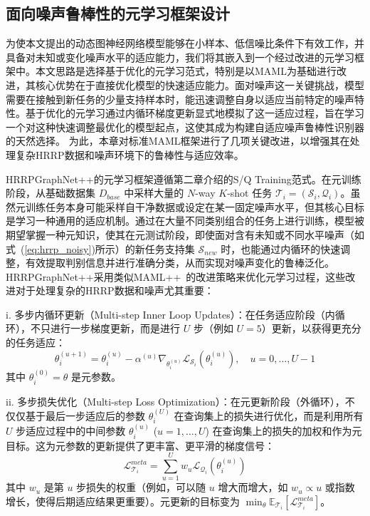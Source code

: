 \subsection{面向噪声鲁棒性的元学习框架设计}
\label{subsec:meta_learning_noise_robust}

为使本文提出的动态图神经网络模型能够在小样本、低信噪比条件下有效工作，并具备对未知或变化噪声水平的适应能力，我们将其嵌入到一个经过改进的元学习框架中。本文思路是选择基于优化的元学习范式，特别是以MAML为基础进行改进，其核心优势在于直接优化模型的快速适应能力。面对噪声这一关键挑战，模型需要在接触到新任务的少量支持样本时，能迅速调整自身以适应当前特定的噪声特性。基于优化的元学习通过内循环梯度更新显式地模拟了这一适应过程，旨在学习一个对这种快速调整最优化的模型起点，这使其成为构建自适应噪声鲁棒性识别器的天然选择。 为此，本章对标准MAML框架进行了几项关键改进，以增强其在处理复杂HRRP数据和噪声环境下的鲁棒性与适应效率。

HRRPGraphNet++的元学习框架遵循第二章介绍的S/Q Training范式。在元训练阶段，从基础数据集 $D_{base}$ 中采样大量的 $N$-way $K$-shot 任务 $\mathcal{T}_i = (\mathcal{S}_i, \mathcal{Q}_i)$。虽然元训练任务本身可能采样自干净数据或设定在某一固定噪声水平，但其核心目标是学习一种通用的适应机制。通过在大量不同类别组合的任务上进行训练，模型被期望掌握一种元知识，使其在元测试阶段，即使面对含有未知或不同水平噪声（如式~(\ref{eq:hrrp_noisy})所示）的新任务支持集 $\mathcal{S}_{new}$ 时，也能通过内循环的快速调整，有效提取判别信息并进行准确分类，从而实现对噪声变化的鲁棒泛化。HRRPGraphNet++采用类似MAML++~\cite{antoniou_how_2018, yao_model-agnostic_2021, zhou_task_2021, raghu_rapid_2020}的改进策略来优化元学习过程，这些改进对于处理复杂的HRRP数据和噪声尤其重要：

i.  多步内循环更新（Multi-step Inner Loop Updates）：在任务适应阶段（内循环），不只进行一步梯度更新，而是进行 $U$ 步（例如 $U=5$）更新，以获得更充分的任务适应：
    \begin{equation}
        \theta_i^{(u+1)} = \theta_i^{(u)} - \alpha^{(u)} \nabla_{\theta_i^{(u)}} \mathcal{L}_{\mathcal{S}_i}(\theta_i^{(u)}), \quad u=0, \dots, U-1
        \label{eq:multi_step_inner_update}
    \end{equation}
    其中 $\theta_i^{(0)} = \theta$ 是元参数。

ii.  多步损失优化（Multi-step Loss Optimization）：在元更新阶段（外循环），不仅仅基于最后一步适应后的参数 $\theta_i^{(U)}$ 在查询集上的损失进行优化，而是利用所有 $U$ 步适应过程中的中间参数 $\theta_i^{(u)}$ ($u=1, \dots, U$) 在查询集上的损失的加权和作为元目标。这为元参数的更新提供了更丰富、更平滑的梯度信号：
    \begin{equation}
        \mathcal{L}_{\mathcal{T}_i}^{meta} = \sum_{u=1}^{U} w_u \mathcal{L}_{\mathcal{Q}_i}(\theta_i^{(u)})
        \label{eq:multi_step_loss}
    \end{equation}
    其中 $w_u$ 是第 $u$ 步损失的权重（例如，可以随 $u$ 增大而增大，如 $w_u \propto u$ 或指数增长，使得后期适应结果更重要）。元更新的目标变为 $\min_{\theta} \mathbb{E}_{\mathcal{T}_i} [\mathcal{L}_{\mathcal{T}_i}^{meta}]$。

